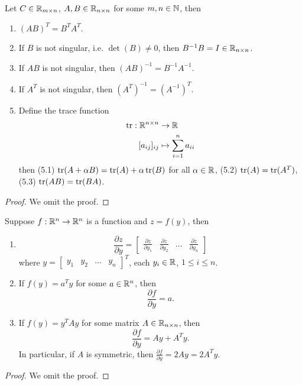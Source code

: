 \documentclass[11pt,fleqn]{book} %
\begin{document}
\begin{proposition} \label{prop:211}
Let \(C \in \mathbb{R}_{m\times n}\), \(A, B \in \mathbb{R}_{n \times n}\) for some \(m, n \in \mathbb{N}\), then
\begin{enumerate}
\item \((AB)^T = B^TA^T\).
\item If \(B\) is not singular, i.e. \(\det(B) \neq 0\), then \(B^{-1}B = I \in \mathbb{R}_{n\times n}\).
\item If \(AB\) is not singular, then \((AB)^{-1} = B^{-1}A^{-1}\).
\item If \(A^T\) is not singular, then \((A^T)^{-1} = (A^{-1})^T\).
\item Define the trace function
\[
\begin{aligned}
\operatorname{tr}: \mathbb{R}^{n\times n} &\rightarrow \mathbb{R} \\
[a_{ij}]_{ij} &\mapsto \sum_{i=1}^n a_{ii}
\end{aligned}
\]
then (5.1) \(\operatorname{tr}(A + \alpha B) = \operatorname{tr}(A) + \alpha\operatorname{tr}(B)\) for all \(\alpha \in \mathbb{R}\), (5.2) \(\operatorname{tr}(A) = \operatorname{tr}(A^T)\), (5.3) \(\operatorname{tr}(AB) = \operatorname{tr}(BA)\).
\end{enumerate}
\end{proposition}
\begin{proof} We omit the proof.\end{proof}

\begin{proposition} \label{prop:212}
Suppose \(f:\mathbb{R}^n\rightarrow\mathbb{R}^n\) is a function and \(z = f(y)\), then
\begin{enumerate}
\item
\[
\frac{\partial z}{\partial y} =
\begin{bmatrix}
\frac{\partial z}{\partial y_1} & \frac{\partial z}{\partial y_2} & \ldots & \frac{\partial z}{\partial y_n}
\end{bmatrix}
\]
where \(y = \begin{bmatrix} y_1 & y_2 & \ldots & y_n\end{bmatrix}^T\), each \(y_i \in \mathbb{R}\), \(1 \leq i \leq n\).
\item If \(f(y) = a^Ty\) for some \(a \in \mathbb{R}^n\), then
\[
\frac{\partial f}{\partial y} = a.
\]
\item If \(f(y) = y^TAy\) for some matrix \(A \in \mathbb{R}_{n\times n}\), then
\[
\frac{\partial f}{\partial y} = Ay + A^Ty.
\]
\indent In particular, if \(A\) is symmetric, then \(\frac{\partial f}{\partial y} = 2Ay = 2A^Ty\).
\end{enumerate}
\end{proposition}
\begin{proof} We omit the proof.\end{proof}
\end{document}
